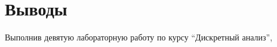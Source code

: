 \section{Выводы}

Выполнив девятую лабораторную работу по курсу \enquote{Дискретный анализ}, 


\pagebreak